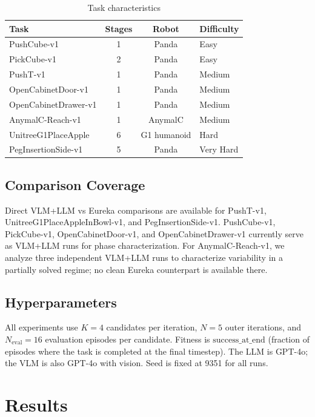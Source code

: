 \documentclass[conference]{IEEEtran}
\begin{document}
\begin{table}[htbp]
\caption{Task characteristics}
\label{tab:tasks}
\centering
\begin{tabular}{lccl}
\toprule
Task & Stages & Robot & Difficulty \\
\midrule
PushCube-v1 & 1 & Panda & Easy \\
PickCube-v1 & 2 & Panda & Easy \\
PushT-v1 & 1 & Panda & Medium \\
OpenCabinetDoor-v1 & 1 & Panda & Medium \\
OpenCabinetDrawer-v1 & 1 & Panda & Medium \\
AnymalC-Reach-v1 & 1 & AnymalC & Medium \\
UnitreeG1PlaceApple & 6 & G1 humanoid & Hard \\
PegInsertionSide-v1 & 5 & Panda & Very Hard \\
\bottomrule
\end{tabular}
\end{table}

\subsection{Comparison Coverage}

Direct VLM+LLM vs Eureka comparisons are available for PushT-v1,
UnitreeG1PlaceAppleInBowl-v1, and PegInsertionSide-v1. PushCube-v1,
PickCube-v1, OpenCabinetDoor-v1, and OpenCabinetDrawer-v1 currently serve as
VLM+LLM runs for phase characterization. For AnymalC-Reach-v1, we analyze
three independent VLM+LLM runs to characterize variability in a partially
solved regime; no clean Eureka counterpart is available there.

\subsection{Hyperparameters}

All experiments use $K=4$ candidates per iteration, $N=5$ outer iterations, and
$N_{\text{eval}}=16$ evaluation episodes per candidate. Fitness is
$\text{success\_at\_end}$ (fraction of episodes where the task is completed at
the final timestep). The LLM is GPT-4o; the VLM is also GPT-4o with vision.
Seed is fixed at 9351 for all runs.



\section{Results}\label{sec:results}
\end{document}
